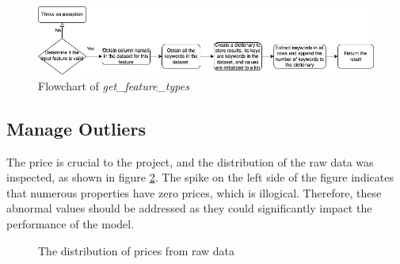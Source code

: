 \documentclass[12pt,twoside]{report}
\begin{document}
\begin{figure}[!htbp]
	\centering
	\includegraphics[width=1\linewidth]{generalize_dataset_get_feature_types}
	\caption{Flowchart of \textit{get\_feature\_types}}
	\label{generalize_dataset_get_feature_types}
\end{figure}

\subsection{Manage Outliers}
The price is crucial to the project, and the distribution of the raw data was inspected, as shown in figure \ref{price_raw}. The spike on the left side of the figure indicates that numerous properties have zero prices, which is illogical. Therefore, these abnormal values should be addressed as they could significantly impact the performance of the model.

\begin{figure}[!htbp]
	\centering
	\hfill
	\hfill
	\caption{The distribution of prices from raw data}
	\label{price_raw}
\end{figure}
\end{document}
